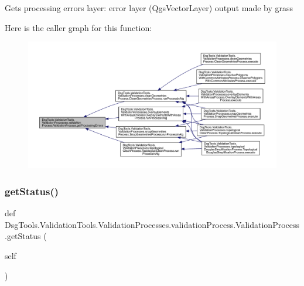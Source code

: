 \begin{DoxyVerb}Gets processing errors
layer: error layer (QgsVectorLayer) output made by grass
\end{DoxyVerb}
 Here is the caller graph for this function\+:
\nopagebreak
\begin{figure}[H]
\begin{center}
\leavevmode
\includegraphics[width=350pt]{class_dsg_tools_1_1_validation_tools_1_1_validation_processes_1_1validation_process_1_1_validation_process_a215af66bf2356fc61fcb06f7fd197da5_icgraph}
\end{center}
\end{figure}
\mbox{\label{class_dsg_tools_1_1_validation_tools_1_1_validation_processes_1_1validation_process_1_1_validation_process_a6668cd6df331f36ef02772e98045242b}} 
\subsubsection{\texorpdfstring{get\+Status()}{getStatus()}}
{\footnotesize\ttfamily def Dsg\+Tools.\+Validation\+Tools.\+Validation\+Processes.\+validation\+Process.\+Validation\+Process.\+get\+Status (\begin{DoxyParamCaption}\item[{}]{self }\end{DoxyParamCaption})}

